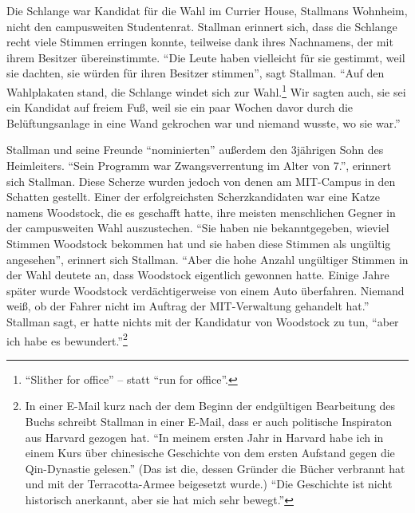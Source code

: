 Die Schlange war Kandidat für die Wahl im Currier House, Stallmans Wohnheim, nicht den campusweiten Studentenrat. Stallman erinnert sich, dass die Schlange recht viele Stimmen erringen konnte, teilweise dank ihres Nachnamens, der mit ihrem Besitzer übereinstimmte. "`Die Leute haben vielleicht für sie gestimmt, weil sie dachten, sie würden für ihren Besitzer stimmen"', sagt Stallman. "`Auf den Wahlplakaten stand, die Schlange \glq windet\grq{} sich zur Wahl.\footnote{"`Slither for office"' – statt "`run for office"'.} Wir sagten auch, sie sei ein Kandidat \glq auf freiem Fuß\grq, weil sie ein paar Wochen davor durch die Belüftungsanlage in eine Wand gekrochen war und niemand wusste, wo sie war."'

Stallman und seine Freunde "`nominierten"' außerdem den 3jährigen Sohn des Heimleiters. "`Sein Programm war Zwangsverrentung im Alter von 7."', erinnert sich Stallman. Diese Scherze wurden jedoch von denen am MIT-Campus in den Schatten gestellt. Einer der erfolgreichsten Scherzkandidaten war eine Katze namens Woodstock, die es geschafft hatte, ihre meisten menschlichen Gegner in der campusweiten Wahl auszustechen. "`Sie haben nie bekanntgegeben, wieviel Stimmen Woodstock bekommen hat und sie haben diese Stimmen als ungültig angesehen"', erinnert sich Stallman. "`Aber die hohe Anzahl ungültiger Stimmen in der Wahl deutete an, dass Woodstock eigentlich gewonnen hatte. Einige Jahre später wurde Woodstock verdächtigerweise von einem Auto überfahren. Niemand weiß, ob der Fahrer nicht im Auftrag der MIT-Verwaltung gehandelt hat."' Stallman sagt, er hatte nichts mit der Kandidatur von Woodstock zu tun, "`aber ich habe es bewundert."'\footnote{In einer E-Mail kurz nach der dem Beginn der endgültigen Bearbeitung des Buchs schreibt Stallman in einer E-Mail, dass er auch politische Inspiraton aus Harvard gezogen hat. "`In meinem ersten Jahr in Harvard habe ich in einem Kurs über chinesische Geschichte von dem ersten Aufstand gegen die Qin-Dynastie gelesen."'  (Das ist die, dessen Gründer die Bücher verbrannt hat und mit der Terracotta-Armee beigesetzt wurde.)  "`Die Geschichte ist nicht historisch anerkannt, aber sie hat mich sehr bewegt."'}

